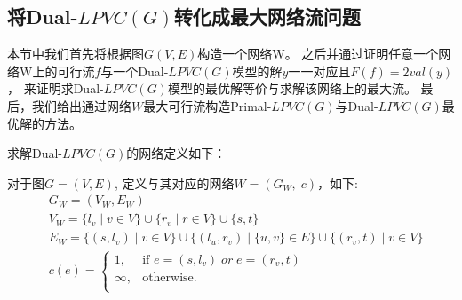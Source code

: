 \subsection{将Dual-$LPVC(G)$转化成最大网络流问题} \label{TransformToNetwork}
本节中我们首先将根据图$G(V, E)$构造一个网络W。
之后并通过证明任意一个网络W上的可行流$f$与一个Dual-$LPVC(G)$模型的解$y$一一对应且$F(f) = 2val(y)$，
来证明求Dual-$LPVC(G)$模型的最优解等价与求解该网络上的最大流。
最后，我们给出通过网络$W$最大可行流构造Primal-$LPVC(G)$与Dual-$LPVC(G)$最优解的方法。

求解Dual-$LPVC(G)$的网络定义如下：
\begin{definition} \label{NetworkDefintion}
对于图$G = (V, E)$, 定义与其对应的网络$W = (G_W,\; c)$，如下:
\begin{equation*}\begin{aligned}
    &G_W = (V_W, E_W) \\
    &V_W = \{l_v\;|\;v \in V\} \cup \{r_v\;|\;r \in V\} \cup \{ s, t \} \\
    &E_W = \{(s, l_v)\;|\;v \in V\} \cup \{(l_u, r_v)\;|\;\{u, v\} \in E\} \cup \{(r_v, t)\;|\;v \in V\}\\
    &c(e) =   \begin{cases}
        1, & \mbox{if } e = (s, l_v)\;or\;e = (r_v, t)\\
        \infty, & \mbox{otherwise.}\\
  \end{cases}
\end{aligned}\end{equation*}
\end{definition}

